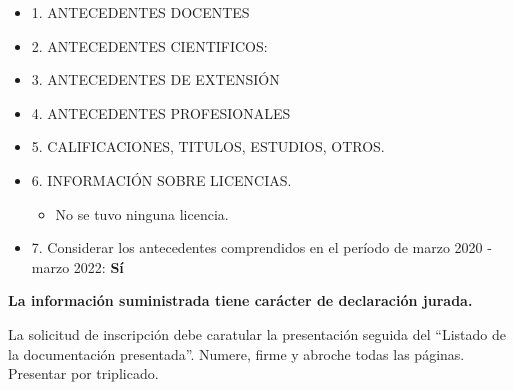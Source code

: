 \documentclass{article}
\begin{document}
\begin{itemize}[leftmargin=-0.7cm]

\label{begin-docentes}
\item[] {1. ANTECEDENTES DOCENTES

\label{end-docentes}
}

\bigskip

\label{begin-cientificos}
\item[] {2. ANTECEDENTES CIENTIFICOS:

\label{end-cientificos}
}

\bigskip

\label{begin-extension}
\item[] {3. ANTECEDENTES DE EXTENSIÓN

\label{end-extension}
}

\bigskip

\label{begin-profesionales}
\item[] {4. ANTECEDENTES PROFESIONALES

\label{end-profesionales}
}

\bigskip

\label{begin-otros}
\item[] {5. CALIFICACIONES, TITULOS, ESTUDIOS, OTROS.

\label{end-otros}
}

\bigskip

\item[] {6. INFORMACIÓN SOBRE LICENCIAS.
\begin{itemize}[leftmargin=0.8cm]
\item[] No se tuvo ninguna licencia.
\end{itemize}
}

\bigskip

\item[] {7. Considerar los antecedentes comprendidos en el período de marzo 2020 - marzo 2022: \textbf{Sí}}

\end{itemize}

\vfill

\begin{center}
{\bf La información suministrada tiene carácter de declaración jurada.

La solicitud de inscripción debe caratular la presentación seguida del ``Listado
de la documentación presentada''. Numere, firme y abroche todas las páginas.
Presentar por triplicado.}
\end{center}
\end{document}
